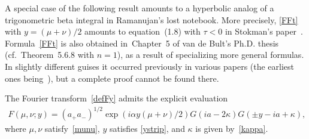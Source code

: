 A special case of the following result amounts to a hyperbolic analog of a trigonometric beta integral in Ramanujan's lost notebook. More precisely, \eqref{FFt} with $y=(\mu+\nu)/2$ amounts to equation~(1.8) with $\tau<0$ in Stokman's paper~\cite{stok}. Formula~\eqref{FFt} is also obtained in~Chapter~5 of van de Bult's Ph.D. thesis~\cite{bult2} (cf.~Theorem~5.6.8 with $n=1$), as a result of specializing more general formulas. In slightly dif\/ferent guises it occurred previously in various papers (the earliest ones being~\cite{faka,kash,pote}), but a complete proof cannot be found there.

\begin{prop}\label{propositionC.1}
The Fourier transform~\eqref{defFy} admits the explicit evaluation
\begin{gather}\label{FFt}
F(\mu,\nu;y)=(a_{+}a_{-})^{1/2}\exp(i\alpha y(\mu+\nu)/2)G(ia-2\kappa)G(\pm y-ia+\kappa),
\end{gather}
where $\mu,\nu$ satisfy~\eqref{munu}, $y$ satisfies \eqref{ystrip}, and $\kappa$ is given by~\eqref{kappa}.
\end{prop}
